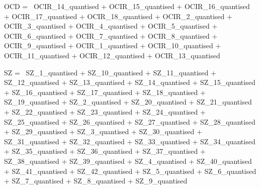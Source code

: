 \documentclass[]{article}
\newenvironment{Shaded}{\begin{snugshade}}{\end{snugshade}}
\newcommand{\StringTok}[1]{\textcolor[rgb]{0.31,0.60,0.02}{#1}}
\begin{document}
\begin{Shaded}
\begin{Highlighting}[]
\StringTok{OCD =~ OCIR_14_quantised    +   }
\StringTok{       OCIR_15_quantised    +   }
\StringTok{       OCIR_16_quantised    +   }
\StringTok{       OCIR_17_quantised    +   }
\StringTok{       OCIR_18_quantised    +   }
\StringTok{       OCIR_2_quantised +   }
\StringTok{       OCIR_3_quantised +   }
\StringTok{       OCIR_4_quantised +   }
\StringTok{       OCIR_5_quantised +   }
\StringTok{       OCIR_6_quantised +   }
\StringTok{       OCIR_7_quantised +   }
\StringTok{       OCIR_8_quantised +   }
\StringTok{       OCIR_9_quantised +   }
\StringTok{       OCIR_1_quantised +   }
\StringTok{       OCIR_10_quantised    +   }
\StringTok{       OCIR_11_quantised    +   }
\StringTok{       OCIR_12_quantised    +   }
\StringTok{       OCIR_13_quantised}

\StringTok{SZ =~ SZ_1_quantised    +}
\StringTok{      SZ_10_quantised   +   }
\StringTok{      SZ_11_quantised + }
\StringTok{      SZ_12_quantised + }
\StringTok{      SZ_13_quantised + }
\StringTok{      SZ_14_quantised + }
\StringTok{      SZ_15_quantised + }
\StringTok{      SZ_16_quantised + }
\StringTok{      SZ_17_quantised + }
\StringTok{      SZ_18_quantised + }
\StringTok{      SZ_19_quantised + }
\StringTok{      SZ_2_quantised + }
\StringTok{      SZ_20_quantised + }
\StringTok{      SZ_21_quantised + }
\StringTok{      SZ_22_quantised + }
\StringTok{      SZ_23_quantised + }
\StringTok{      SZ_24_quantised + }
\StringTok{      SZ_25_quantised + }
\StringTok{      SZ_26_quantised + }
\StringTok{      SZ_27_quantised + }
\StringTok{      SZ_28_quantised + }
\StringTok{      SZ_29_quantised + }
\StringTok{      SZ_3_quantised + }
\StringTok{      SZ_30_quantised + }
\StringTok{      SZ_31_quantised + }
\StringTok{      SZ_32_quantised + }
\StringTok{      SZ_33_quantised + }
\StringTok{      SZ_34_quantised + }
\StringTok{      SZ_35_quantised + }
\StringTok{      SZ_36_quantised + }
\StringTok{      SZ_37_quantised + }
\StringTok{      SZ_38_quantised + }
\StringTok{      SZ_39_quantised + }
\StringTok{      SZ_4_quantised + }
\StringTok{      SZ_40_quantised + }
\StringTok{      SZ_41_quantised + }
\StringTok{      SZ_42_quantised + }
\StringTok{      SZ_5_quantised + }
\StringTok{      SZ_6_quantised + }
\StringTok{      SZ_7_quantised + }
\StringTok{      SZ_8_quantised + }
\StringTok{      SZ_9_quantised}


\end{Highlighting}
\end{Shaded}
\end{document}
